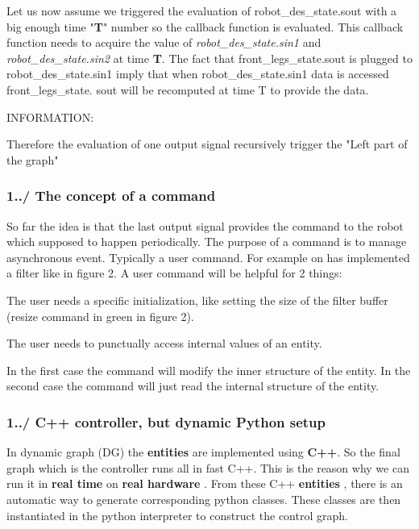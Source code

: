 Let us now assume we triggered the evaluation of robot\+\_\+des\+\_\+state.\+sout with a big enough time "{\bfseries T}" number so the callback function is evaluated. This callback function needs to acquire the value of {\itshape robot\+\_\+des\+\_\+state.\+sin1} and {\itshape robot\+\_\+des\+\_\+state.\+sin2} at time {\bfseries T}. The fact that front\+\_\+legs\+\_\+state.\+sout is plugged to robot\+\_\+des\+\_\+state.\+sin1 imply that when robot\+\_\+des\+\_\+state.\+sin1 data is accessed front\+\_\+legs\+\_\+state. sout will be recomputed at time T to provide the data.


\begin{DoxyCode}
INFORMATION:

Therefore the evaluation of one output signal recursively
trigger the \textcolor{stringliteral}{"Left part of the graph"}
\end{DoxyCode}
\hypertarget{index_intro_subsec_commands}{}\subsubsection{1../ The concept of a command}\label{index_intro_subsec_commands}
So far the idea is that the last output signal provides the command to the robot which supposed to happen periodically. The purpose of a command is to manage asynchronous event. Typically a user command. For example on has implemented a filter like in figure 2. A user command will be helpful for 2 things\+:
\begin{DoxyEnumerate}
\item The user needs a specific initialization, like setting the size of the filter buffer (resize command in green in figure 2).
\item The user needs to punctually access internal values of an entity.
\end{DoxyEnumerate}

In the first case the command will modify the inner structure of the entity. In the second case the command will just read the internal structure of the entity.\hypertarget{index_intro_subsec_python}{}\subsubsection{1../ C++ controller, but dynamic Python setup}\label{index_intro_subsec_python}
In dynamic graph (DG) the {\bfseries entities} are implemented using {\bfseries C++}. So the final graph which is the controller runs all in fast C++. This is the reason why we can run it in {\bfseries  real time } on {\bfseries  real hardware }. From these C++ {\bfseries entities} , there is an automatic way to generate corresponding python classes. These classes are then instantiated in the python interpreter to construct the control graph.

